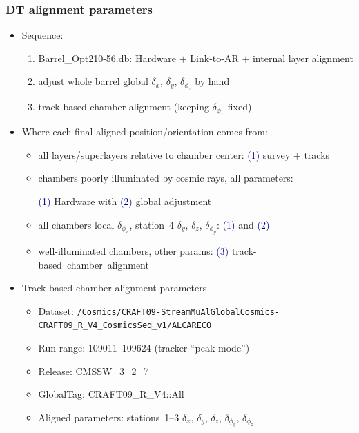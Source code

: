 \documentclass[compress]{beamer}
\begin{document}
\begin{frame}
\frametitle{DT alignment parameters}

\scriptsize
\vspace{-0.25 cm}
\begin{itemize}
\item \scriptsize Sequence:
\begin{enumerate}
\scriptsize \item \scriptsize Barrel\_Opt210-56.db: Hardware $+$ Link-to-AR $+$ internal layer alignment
\item \scriptsize adjust whole barrel global $\delta_x$, $\delta_y$, $\delta_{\phi_z}$ by hand
\item \scriptsize track-based chamber alignment (keeping $\delta_{\phi_x}$ fixed)
\end{enumerate}
\item \scriptsize Where each final aligned position/orientation comes from:
\begin{itemize}
\item \scriptsize all layers/superlayers relative to chamber center: \textcolor{darkblue}{(1)} survey $+$ tracks
\item \scriptsize chambers poorly illuminated by cosmic rays, all parameters:

\textcolor{darkblue}{(1)} Hardware with \textcolor{darkblue}{(2)} global adjustment
\item \scriptsize all chambers local $\delta_{\phi_x}$, station~4 $\delta_y$, $\delta_z$, $\delta_{\phi_y}$: \textcolor{darkblue}{(1)} and \textcolor{darkblue}{(2)}
\item \scriptsize well-illuminated chambers, other params: \textcolor{darkblue}{(3)} \mbox{track-based chamber alignment\hspace{-1 cm}}
\end{itemize}
\item \scriptsize Track-based chamber alignment parameters
\begin{itemize}
\item \scriptsize Dataset: \mbox{\tiny \tt /Cosmics/CRAFT09-StreamMuAlGlobalCosmics-CRAFT09\_R\_V4\_CosmicsSeq\_v1/ALCARECO\hspace{-2 cm}}
\item \scriptsize Run range: 109011--109624 (tracker ``peak mode'')
\item \scriptsize Release: CMSSW\_3\_2\_7
\item \scriptsize GlobalTag: CRAFT09\_R\_V4::All
\item \scriptsize Aligned parameters: stations~1--3 $\delta_x$, $\delta_y$, $\delta_z$, $\delta_{\phi_y}$, $\delta_{\phi_z}$


\end{itemize}
\end{itemize}
\end{frame}
\end{document}
